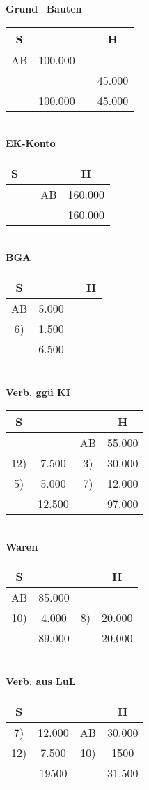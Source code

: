 \documentclass[paper=a4, fontsize=11pt]{scrartcl}
\numberwithin{equation}{section}
\numberwithin{figure}{section}
\numberwithin{table}{section}
\begin{document}
\textbf{Grund+Bauten}
\begin{tabular}{cc|cc}
S & & & H \\\hline
AB & 100.000 & & \\
  & & & 45.000 \\\hline
  & 100.000 & & 45.000 \\\hline
\end{tabular} \\
\textbf{EK-Konto}
\begin{tabular}{cc|cc}
S & & & H \\\hline
  & & AB & 160.000 \\\hline
  & & & 160.000 \\\hline
\end{tabular} \\
\textbf{BGA}
\begin{tabular}{cc|cc}
S & & & H \\\hline
AB & 5.000 & & \\
6) & 1.500 & & \\\hline
  & 6.500 & & \\\hline
\end{tabular} \\
\textbf{Verb. ggü KI}
\begin{tabular}{cc|cc}
S & & & H \\\hline
 & & AB & 55.000 \\
12) & 7.500 & 3) &30.000 \\
5) & 5.000 & 7) & 12.000 \\\hline
  &12.500 & & 97.000 \\\hline
\end{tabular} \\
\textbf{Waren}
\begin{tabular}{cc|cc}
S & & & H \\\hline
AB & 85.000 & & \\
10) & 4.000 & 8) & 20.000 \\\hline
  & 89.000 & & 20.000 \\\hline
\end{tabular} \\
\textbf{Verb. aus LuL}
\begin{tabular}{cc|cc}
S & & & H \\\hline
7) & 12.000 &  AB & 30.000 \\
12) & 7.500 & 10) & 1500 \\\hline
  & 19500 & & 31.500 \\\hline
\end{tabular} \\
\end{document}
